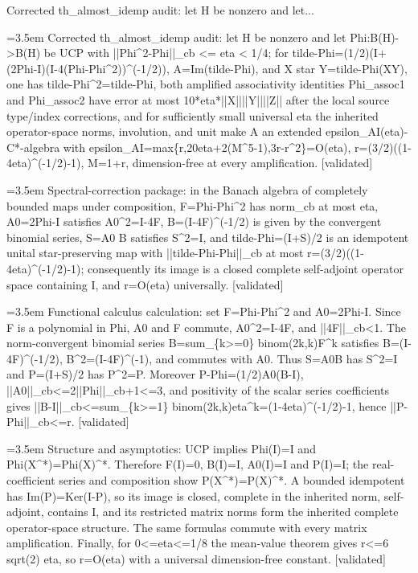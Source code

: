 \documentclass{article}
\newcommand{\step}[1]{\par\noindent\hangindent=3.5em\hangafter=1%
  \makebox[3.5em][l]{\textbf{#1.}}}
\newcommand{\steptag}[1]{\hfill{\small\textsf{[#1]}}}
\begin{document}
\begin{proofbox}{Corrected th\_almost\_idemp audit: let H be nonzero and let...}
\step{1} Corrected th\_almost\_idemp audit: let H be nonzero and let Phi:B(H)->B(H) be UCP with ||Phi\textasciicircum{}2-Phi||\_cb <= eta < 1/4; for tilde-Phi=(1/2)(I+(2Phi-I)(I-4(Phi-Phi\textasciicircum{}2))\textasciicircum{}(-1/2)), A=Im(tilde-Phi), and X star Y=tilde-Phi(XY), one has tilde-Phi\textasciicircum{}2=tilde-Phi, both amplified associativity identities Phi\_assoc1 and Phi\_assoc2 have error at most 10*eta*||X||||Y||||Z|| after the local source type/index corrections, and for sufficiently small universal eta the inherited operator-space norms, involution, and unit make A an extended epsilon\_AI(eta)-C*-algebra with epsilon\_AI=max\{r,20eta+2(M\textasciicircum{}5-1),3r-r\textasciicircum{}2\}=O(eta), r=(3/2)((1-4eta)\textasciicircum{}(-1/2)-1), M=1+r, dimension-free at every amplification. \steptag{validated} \\[6pt]
\step{1.1} Spectral-correction package: in the Banach algebra of completely bounded maps under composition, F=Phi-Phi\textasciicircum{}2 has norm\_cb at most eta, A0=2Phi-I satisfies A0\textasciicircum{}2=I-4F, B=(I-4F)\textasciicircum{}(-1/2) is given by the convergent binomial series, S=A0 B satisfies S\textasciicircum{}2=I, and tilde-Phi=(I+S)/2 is an idempotent unital star-preserving map with ||tilde-Phi-Phi||\_cb at most r=(3/2)((1-4eta)\textasciicircum{}(-1/2)-1); consequently its image is a closed complete self-adjoint operator space containing I, and r=O(eta) universally. \steptag{validated} \\[6pt]
\step{1.1.1} Functional calculus calculation: set F=Phi-Phi\textasciicircum{}2 and A0=2Phi-I. Since F is a polynomial in Phi, A0 and F commute, A0\textasciicircum{}2=I-4F, and ||4F||\_cb<1. The norm-convergent binomial series B=sum\_\{k>=0\} binom(2k,k)F\textasciicircum{}k satisfies B=(I-4F)\textasciicircum{}(-1/2), B\textasciicircum{}2=(I-4F)\textasciicircum{}(-1), and commutes with A0. Thus S=A0B has S\textasciicircum{}2=I and P=(I+S)/2 has P\textasciicircum{}2=P. Moreover P-Phi=(1/2)A0(B-I), ||A0||\_cb<=2||Phi||\_cb+1<=3, and positivity of the scalar series coefficients gives ||B-I||\_cb<=sum\_\{k>=1\} binom(2k,k)eta\textasciicircum{}k=(1-4eta)\textasciicircum{}(-1/2)-1, hence ||P-Phi||\_cb<=r. \steptag{validated} \\[4pt]
\step{1.1.2} Structure and asymptotics: UCP implies Phi(I)=I and Phi(X\textasciicircum{}*)=Phi(X)\textasciicircum{}*. Therefore F(I)=0, B(I)=I, A0(I)=I and P(I)=I; the real-coefficient series and composition show P(X\textasciicircum{}*)=P(X)\textasciicircum{}*. A bounded idempotent has Im(P)=Ker(I-P), so its image is closed, complete in the inherited norm, self-adjoint, contains I, and its restricted matrix norms form the inherited complete operator-space structure. The same formulas commute with every matrix amplification. Finally, for 0<=eta<=1/8 the mean-value theorem gives r<=6 sqrt(2) eta, so r=O(eta) with a universal dimension-free constant. \steptag{validated} \\[4pt]

\end{proofbox}
\end{document}

